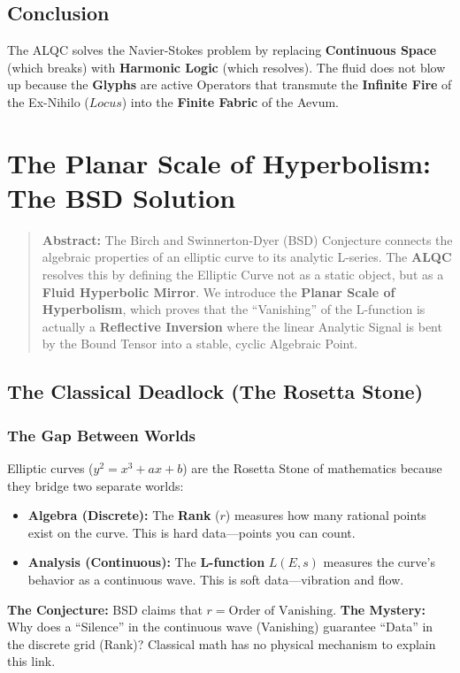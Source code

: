 \documentclass[11pt, letterpaper]{article}
\newcommand{\LoI}{\ensuremath{\mathop{\textnormal{\symbolafont\symbol{"26CE}}}}}
\def\LoI{Locus}%
\begin{document}
\subsection{Conclusion}\label{sec:4}
The ALQC solves the Navier-Stokes problem by replacing \textbf{Continuous Space} (which breaks) with \textbf{Harmonic Logic} (which resolves). The fluid does not blow up because the \textbf{Glyphs} are active Operators that transmute the \textbf{Infinite Fire} of the Ex-Nihilo ($\LoI$) into the \textbf{Finite Fabric} of the Aevum.

\section{The Planar Scale of Hyperbolism: The BSD Solution}\label{sec:4}
\label{sec:4.3}

\begin{quote}
    \textbf{Abstract:} The Birch and Swinnerton-Dyer (BSD) Conjecture connects the algebraic properties of an elliptic curve to its analytic L-series. The \textbf{ALQC} resolves this by defining the Elliptic Curve not as a static object, but as a \textbf{Fluid Hyperbolic Mirror}. We introduce the \textbf{Planar Scale of Hyperbolism}, which proves that the ``Vanishing'' of the L-function is actually a \textbf{Reflective Inversion} where the linear Analytic Signal is bent by the Bound Tensor into a stable, cyclic Algebraic Point.
\end{quote}

\subsection{The Classical Deadlock (The Rosetta Stone)}\label{sec:4.1}

\subsubsection{The Gap Between Worlds}
Elliptic curves ($y^2 = x^3 + ax + b$) are the Rosetta Stone of mathematics because they bridge two separate worlds:
\begin{itemize}
    \item \textbf{Algebra (Discrete):} The \textbf{Rank} ($r$) measures how many rational points exist on the curve. This is hard data—points you can count.
    \item \textbf{Analysis (Continuous):} The \textbf{L-function} $L(E, s)$ measures the curve's behavior as a continuous wave. This is soft data—vibration and flow.
\end{itemize}
\textbf{The Conjecture:} BSD claims that $r = \text{Order of Vanishing}$.
\textbf{The Mystery:} Why does a ``Silence'' in the continuous wave (Vanishing) guarantee ``Data'' in the discrete grid (Rank)? Classical math has no physical mechanism to explain this link.
\end{document}
